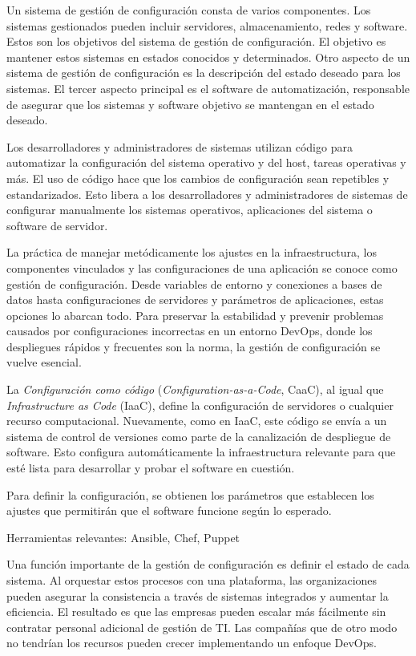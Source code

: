 \documentclass[12pt]{book}
\begin{document}
Un sistema de gestión de configuración consta de varios componentes. Los sistemas gestionados pueden incluir servidores, almacenamiento, redes y software. Estos son los objetivos del sistema de gestión de configuración. El objetivo es mantener estos sistemas en estados conocidos y determinados. Otro aspecto de un sistema de gestión de configuración es la descripción del estado deseado para los sistemas. El tercer aspecto principal es el software de automatización, responsable de asegurar que los sistemas y software objetivo se mantengan en el estado deseado.

Los desarrolladores y administradores de sistemas utilizan código para automatizar la configuración del sistema operativo y del host, tareas operativas y más. El uso de código hace que los cambios de configuración sean repetibles y estandarizados. Esto libera a los desarrolladores y administradores de sistemas de configurar manualmente los sistemas operativos, aplicaciones del sistema o software de servidor.

La práctica de manejar metódicamente los ajustes en la infraestructura, los componentes vinculados y las configuraciones de una aplicación se conoce como gestión de configuración. Desde variables de entorno y conexiones a bases de datos hasta configuraciones de servidores y parámetros de aplicaciones, estas opciones lo abarcan todo. Para preservar la estabilidad y prevenir problemas causados por configuraciones incorrectas en un entorno DevOps, donde los despliegues rápidos y frecuentes son la norma, la gestión de configuración se vuelve esencial.

La \textit{Configuración como código} (\textit{Configuration-as-a-Code}, CaaC), al igual que \textit{Infrastructure as Code} (IaaC), define la configuración de servidores o cualquier recurso computacional. Nuevamente, como en IaaC, este código se envía a un sistema de control de versiones como parte de la canalización de despliegue de software. Esto configura automáticamente la infraestructura relevante para que esté lista para desarrollar y probar el software en cuestión.

Para definir la configuración, se obtienen los parámetros que establecen los ajustes que permitirán que el software funcione según lo esperado.

Herramientas relevantes: Ansible, Chef, Puppet

Una función importante de la gestión de configuración es definir el estado de cada sistema. Al orquestar estos procesos con una plataforma, las organizaciones pueden asegurar la consistencia a través de sistemas integrados y aumentar la eficiencia. El resultado es que las empresas pueden escalar más fácilmente sin contratar personal adicional de gestión de TI. Las compañías que de otro modo no tendrían los recursos pueden crecer implementando un enfoque DevOps.
\end{document}
